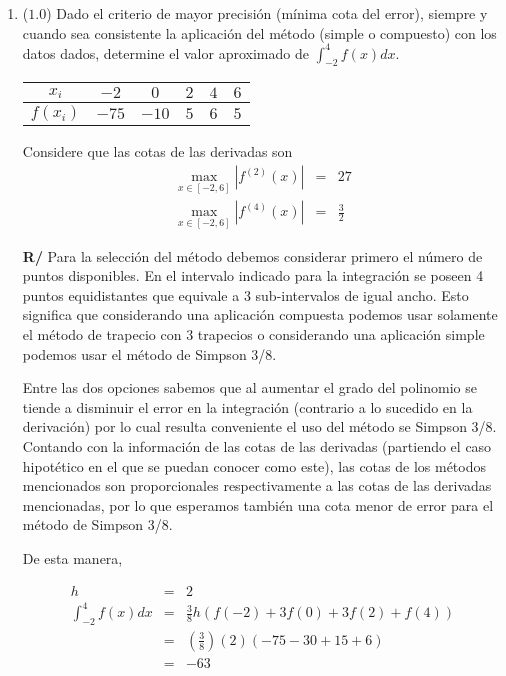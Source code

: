 \documentclass[12pt]{article}
\begin{document}
\vspace{-.5cm}
  \begin{enumerate}[leftmargin=*,widest=9]


    \item (\(1.0\)) Dado el criterio de mayor precisión (mínima cota del error), siempre y cuando sea consistente la aplicación del método (simple o compuesto) con los datos dados, determine el valor aproximado de \(\int_{-2}^4 f(x)dx\).
    
\begin{center}
\begin{tabular}{|c|c|c|c|c|c|}
\hline
$x_i$ & $-2$ & $0$ & $2$ & $4$ & $6$\\ \hline
$f(x_i)$ & $-75$ & $-10$ & $5$ & $6$ & $5$\\
\hline
\end{tabular}
\end{center}

Considere que las cotas de las derivadas son 
\begin{eqnarray*}
\max_{x\in [-2,6]} |f^{(2)}(x)| &=& 27 \\
\max_{x\in [-2,6]} |f^{(4)}(x)| &=& \frac{3}{2}
\end{eqnarray*}


\textbf{R/} Para la selección del método debemos considerar primero el número de puntos disponibles. En el intervalo indicado para la integración se poseen 4 puntos equidistantes que equivale a 3 sub-intervalos de igual ancho. Esto significa que considerando una aplicación compuesta podemos usar solamente el método de trapecio con 3 trapecios o considerando una aplicación simple podemos usar el método de Simpson 3/8.

Entre las dos opciones sabemos que al aumentar el grado del polinomio se tiende a disminuir el error en la integración (contrario a lo sucedido en la derivación) por lo cual resulta conveniente el uso del método se Simpson 3/8. Contando con la información de las cotas de las derivadas (partiendo el caso hipotético en el que se puedan conocer como este), las cotas de los métodos mencionados son proporcionales respectivamente a las cotas de las derivadas mencionadas, por lo que esperamos también una cota menor de error para el método de Simpson 3/8.

De esta manera, 

\begin{eqnarray*}
h & = & 2\\
\int_{-2}^{4}f(x)dx &=& \frac{3}{8}h\left(f(-2) + 3f(0) + 3f(2) + f(4) \right)\\
&=& \left(\frac{3}{8}\right)(2)(-75-30+15+6)\\
&=&-63
\end{eqnarray*}


\end{enumerate}
\end{document}
